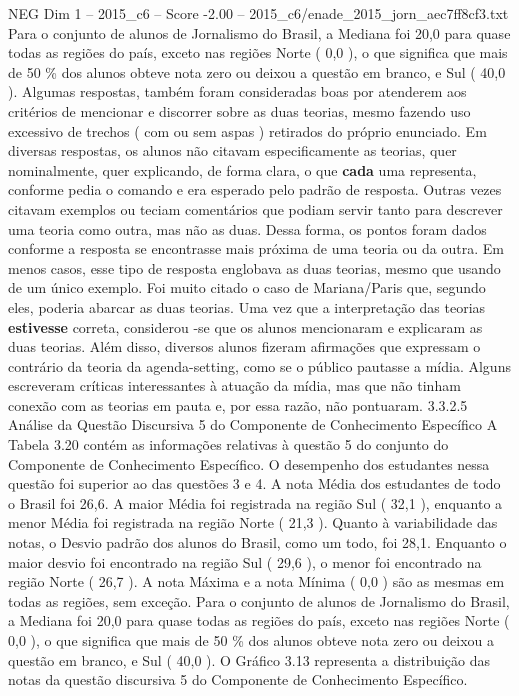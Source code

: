 \begin{textsample}{NEG Dim 1 – 2015\_c6 – Score -2.00 – 2015\_c6/enade\_2015\_jorn\_aec7ff8cf3.txt}
Para o conjunto de alunos de Jornalismo do Brasil, a Mediana foi 20,0 para quase todas as regiões do país, exceto nas regiões Norte ( 0,0 ), o que significa que mais de 50 \% dos alunos obteve nota zero ou deixou a questão em branco, e Sul ( 40,0 ).
Algumas respostas, também foram consideradas boas por atenderem aos critérios de mencionar e discorrer sobre as duas teorias, mesmo fazendo uso excessivo de trechos ( com ou sem aspas ) retirados do próprio enunciado.
Em diversas respostas, os alunos não citavam especificamente as teorias, quer nominalmente, quer explicando, de forma clara, o que \textbf{cada} uma representa, conforme pedia o comando e era esperado pelo padrão de resposta.
Outras vezes citavam exemplos ou teciam comentários que podiam servir tanto para descrever uma teoria como outra, mas não as duas.
Dessa forma, os pontos foram dados conforme a resposta se encontrasse mais próxima de uma teoria ou da outra.
Em menos casos, esse tipo de resposta englobava as duas teorias, mesmo que usando de um único exemplo.
Foi muito citado o caso de Mariana/Paris que, segundo eles, poderia abarcar as duas teorias.
Uma vez que a interpretação das teorias \textbf{estivesse} correta, considerou -se que os alunos mencionaram e explicaram as duas teorias.
Além disso, diversos alunos fizeram afirmações que expressam o contrário da teoria da agenda-setting, como se o público pautasse a mídia.
Alguns escreveram críticas interessantes à atuação da mídia, mas que não tinham conexão com as teorias em pauta e, por essa razão, não pontuaram. 3.3.2.5 Análise da Questão Discursiva 5 do Componente de Conhecimento Específico A Tabela 3.20 contém as informações relativas à questão 5 do conjunto do Componente de Conhecimento Específico.
O desempenho dos estudantes nessa questão foi superior ao das questões 3 e 4.
A nota Média dos estudantes de todo o Brasil foi 26,6.
A maior Média foi registrada na região Sul ( 32,1 ), enquanto a menor Média foi registrada na região Norte ( 21,3 ).
Quanto à variabilidade das notas, o Desvio padrão dos alunos do Brasil, como um todo, foi 28,1.
Enquanto o maior desvio foi encontrado na região Sul ( 29,6 ), o menor foi encontrado na região Norte ( 26,7 ).
A nota Máxima e a nota Mínima ( 0,0 ) são as mesmas em todas as regiões, sem exceção.
Para o conjunto de alunos de Jornalismo do Brasil, a Mediana foi 20,0 para quase todas as regiões do país, exceto nas regiões Norte ( 0,0 ), o que significa que mais de 50 \% dos alunos obteve nota zero ou deixou a questão em branco, e Sul ( 40,0 ).
O Gráfico 3.13 representa a distribuição das notas da questão discursiva 5 do Componente de Conhecimento Específico.

\end{textsample}
